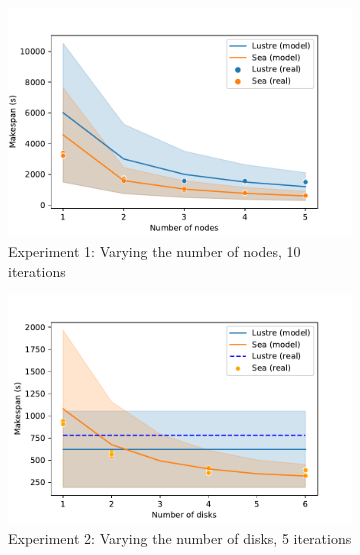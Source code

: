     \begin{figure}

    \begin{subfigure}{0.5\columnwidth}
        \centering
        \captionsetup{width=.85\linewidth}
        \includegraphics[width=\columnwidth]{figures/sea-comp/nodes.pdf}%
        \caption{Experiment 1: Varying the number of nodes, 10 iterations}\label{fig:sea-comp:nodes}
    \end{subfigure}
    \begin{subfigure}{0.5\columnwidth}
        \centering
        \captionsetup{width=.85\linewidth}
        \includegraphics[width=\linewidth]{figures/sea-comp/disks.pdf}
        \caption{Experiment 2: Varying the number of disks, 5 iterations}\label{fig:sea-comp:disks}
    \end{subfigure}
    \begin{subfigure}{0.5\columnwidth}

\end{subfigure}
\end{figure}
